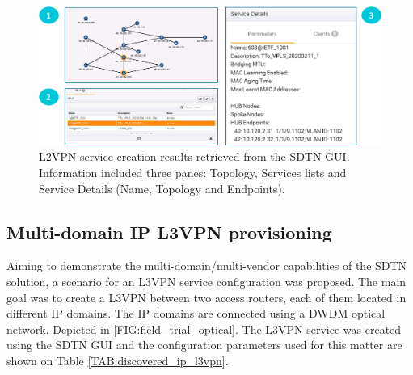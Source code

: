 \documentclass[a4paper,fleqn]{cas-dc}
\begin{document}
\begin{figure}
	\centering
		\includegraphics[width=\linewidth]{figs/l2vpn_results.png}
	\caption{L2VPN service creation results retrieved from the SDTN GUI. Information included three panes: Topology, Services lists and Service Details (Name, Topology and Endpoints).}
	\label{FIG:L2SM_results}
\end{figure}


\subsection{Multi-domain IP L3VPN provisioning}

Aiming to demonstrate the multi-domain/multi-vendor capabilities of the SDTN solution, a scenario for an L3VPN service configuration was proposed. The main goal was to create a L3VPN between two access routers, each of them located in different IP domains. The IP domains are connected using a DWDM optical network. Depicted in \cref{FIG:field_trial_optical}. The L3VPN service was created using the SDTN GUI and the configuration parameters used for this matter are shown on Table \cref{TAB:discovered_ip_l3vpn}.
\end{document}
